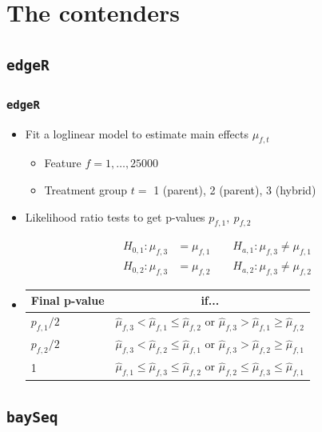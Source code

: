 \documentclass{beamer}
\providecommand{\wh}[1]{\widehat{#1}}
\numberwithin{equation}{section}
\begin{document}
\section{The contenders}

\subsection{{\tt edgeR}}

\begin{frame}
\frametitle{{\tt edgeR}}

\begin{itemize}
\item Fit a loglinear model to estimate main effects $\mu_{f, t}$
\begin{itemize}
\item Feature $f = 1, \ldots, 25000$
\item Treatment group $t = $ 1 (parent), 2 (parent), 3 (hybrid)
\end{itemize}
\pause \item Likelihood ratio tests to get p-values $p_{f, 1}, \ p_{f, 2}$

\begin{align*}
H_{0, 1}: \mu_{f, 3} &= \mu_{f, 1} \qquad H_{a, 1}: \mu_{f, 3} \ne \mu_{f, 1} \\
H_{0, 2}: \mu_{f, 3} &= \mu_{f, 2} \qquad H_{a, 2}: \mu_{f, 3} \ne \mu_{f, 2}
\end{align*}


\pause \item 
\begin{center}
\begin{tabular}{l|c}
Final p-value & if... \\ \hline
$p_{f, 1}/2$ & $\wh{\mu}_{f, 3} < \wh{\mu}_{f, 1} \le \wh{\mu}_{f, 2}$ or $\wh{\mu}_{f, 3} > \wh{\mu}_{f, 1} \ge \wh{\mu}_{f, 2}$ \\
$p_{f, 2}/2$ & $\wh{\mu}_{f, 3} < \wh{\mu}_{f, 2} \le \wh{\mu}_{f, 1}$ or $\wh{\mu}_{f, 3} > \wh{\mu}_{f, 2} \ge \wh{\mu}_{f, 1}$ \\
1 & $\wh{\mu}_{f, 1} \le \wh{\mu}_{f, 3} \le \wh{\mu}_{f, 2}$ or $\wh{\mu}_{f, 2} \le \wh{\mu}_{f, 3} \le \wh{\mu}_{f, 1}$
\end{tabular}
\end{center}

\end{itemize}
\end{frame}


\subsection{{\tt baySeq}}
\end{document}
